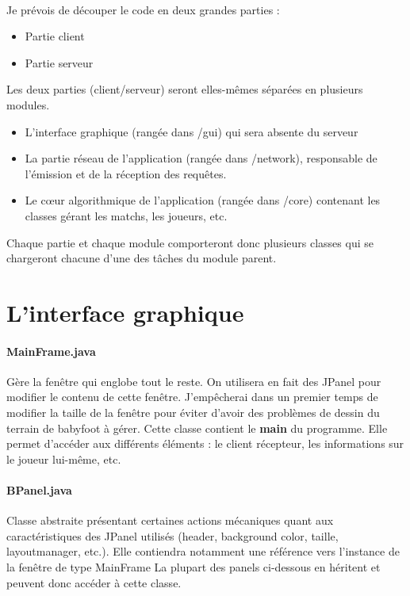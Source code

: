 \documentclass[a4paper,12pt]{report}
\begin{document}
\paragraph{}
Je prévois de découper le code en deux grandes parties :
\begin{itemize}
    \item Partie client
    \item Partie serveur
\end{itemize}
Les deux parties (client/serveur) seront elles-mêmes séparées en plusieurs modules.
\begin{itemize}
    \item L'interface graphique (rangée dans /gui) qui sera absente du serveur
    \item La partie réseau de l'application (rangée dans /network), responsable de l'émission et de la réception des requêtes.
    \item Le c\oe{}ur algorithmique de l'application (rangée dans /core) contenant les classes gérant les matchs, les joueurs, etc.
\end{itemize}
Chaque partie et chaque module comporteront donc plusieurs classes qui se chargeront chacune d'une des tâches du module parent.


\section{L'interface graphique}
\paragraph{MainFrame.java}
Gère la fenêtre qui englobe tout le reste. On utilisera en fait des JPanel pour modifier le contenu de cette fenêtre. J'empêcherai dans un premier temps de modifier la taille de la fenêtre pour éviter d'avoir des problèmes de dessin du terrain de babyfoot à gérer. Cette classe contient le \textbf{main} du programme. Elle permet d'accéder aux différents éléments : le client récepteur, les informations sur le joueur lui-même, etc.
\paragraph{BPanel.java}
Classe abstraite présentant certaines actions mécaniques quant aux caractéristiques des JPanel utilisés (header, background color, taille, layoutmanager, etc.). Elle contiendra notamment une référence vers l'instance de la fenêtre de type MainFrame La plupart des panels ci-dessous en héritent et peuvent donc accéder à cette classe.
\end{document}
